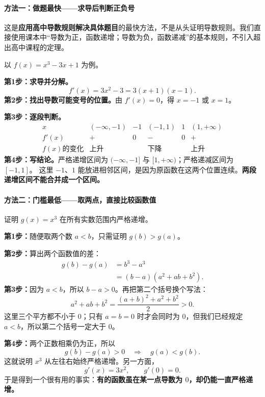 \clearpage
\begin{proofbox}
\paragraph{方法一：做题最快——求导后判断正负号}
\begin{center}\end{center}

这是\textbf{应用高中导数规则解决具体题目}的最快方法，不是从头证明导数规则。我们直接使用课本中``导数为正，函数递增；导数为负，函数递减''的基本规则，不引入超出高中课程的定理。

以 $f(x)=x^3-3x+1$ 为例。

\textbf{第1步：求导并分解。}
\[
f'(x)=3x^2-3=3(x+1)(x-1).
\]
\textbf{第2步：找出导数可能变号的位置。}由 $f'(x)=0$，得 $x=-1$ 或 $x=1$。

\textbf{第3步：逐段判断。}
\[
\begin{array}{c|ccccc}
x&(-\infty,-1)&-1&(-1,1)&1&(1,+\infty)\\ \hline
f'(x)&+&0&-&0&+\\
f(x)\text{的变化}&\text{上升}&&\text{下降}&&\text{上升}
\end{array}
\]
\textbf{第4步：写结论。}严格递增区间为 $(-\infty,-1]$ 与 $[1,+\infty)$；严格递减区间为 $[-1,1]$。
这里 $-1$、$1$ 能放进相邻区间，是因为原函数在这两个位置连续。\textbf{两段递增区间不能合并成一个区间。}

\end{proofbox}
\clearpage
\begin{proofbox}
\paragraph{方法二：门槛最低——取两点，直接比较函数值}
\begin{center}\end{center}

证明 $g(x)=x^3$ 在所有实数范围内严格递增。

\textbf{第1步：}随便取两个数 $a<b$，只需证明 $g(b)>g(a)$。

\textbf{第2步：}算出两个函数值的差：
\[
\begin{aligned}
g(b)-g(a)&=b^3-a^3\\
&=(b-a)(a^2+ab+b^2).
\end{aligned}
\]
\textbf{第3步：}因为 $a<b$，所以 $b-a>0$。再把第二个括号换个写法：
\[
a^2+ab+b^2=\frac{(a+b)^2+a^2+b^2}{2}>0.
\]
这里三个平方都不小于 $0$；只有 $a=b=0$ 时才会同时为 $0$，但我们已经规定 $a<b$，所以第二个括号一定大于 $0$。

\textbf{第4步：}两个正数相乘仍为正，所以
\[
g(b)-g(a)>0\quad\Longrightarrow\quad g(a)<g(b).
\]
这就说明 $x^3$ 从左往右始终严格递增。另一方面，
\[
g'(x)=3x^2,\qquad g'(0)=0.
\]
于是得到一个很有用的事实：\textbf{有的函数虽在某一点导数为 $0$，却仍能一直严格递增。}

\end{proofbox}
